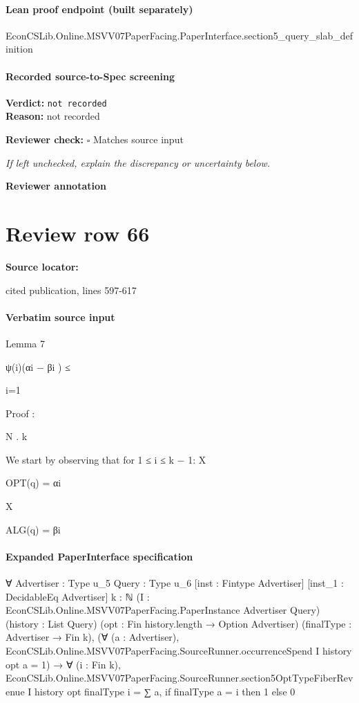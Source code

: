 \documentclass[10pt]{article}
\newcommand{\reviewerbox}{%
  \par\noindent\fbox{\parbox{0.96\linewidth}{\rule{0pt}{0.38in}}}\par
}
\newcommand{\reviewmatch}[1]{%
  \par\noindent\textbf{Reviewer check:} $\square$\; #1\par
  \noindent\emph{If left unchecked, explain the discrepancy or uncertainty below.}\par
}
\begin{document}
\paragraph{Lean proof endpoint (built separately)}\begin{ReviewVerbatim}
EconCSLib.Online.MSVV07PaperFacing.PaperInterface.section5_query_slab_definition
\end{ReviewVerbatim}

\paragraph{Recorded source-to-Spec screening}
\textbf{Verdict:} \texttt{not recorded}
\\
\textbf{Reason:} not recorded
\reviewmatch{Matches source input}
\noindent\textbf{Reviewer annotation}\par
\reviewerbox
\clearpage
\hypertarget{source-claim-ef85e288c3a31c13}{}
\section*{Review row 66}
\textbf{Source locator:} {\footnotesize\raggedright cited publication, lines 597-\allowbreak{}617\par}
\paragraph{Verbatim source input}
\begin{ReviewVerbatim}
Lemma 7

ψ(i)(αi − βi ) ≤

i=1

Proof :

N
.
k

We start by observing that for 1 ≤ i ≤ k − 1:
X

OPT(q) = αi

X

ALG(q) = βi
\end{ReviewVerbatim}


\paragraph{Expanded PaperInterface specification}
\begin{ReviewVerbatim}
∀ {Advertiser : Type u_5} {Query : Type u_6} [inst : Fintype Advertiser] [inst_1 : DecidableEq Advertiser] {k : ℕ}
  (I : EconCSLib.Online.MSVV07PaperFacing.PaperInstance Advertiser Query) (history : List Query)
  (opt : Fin history.length → Option Advertiser) (finalType : Advertiser → Fin k),
  (∀ (a : Advertiser), EconCSLib.Online.MSVV07PaperFacing.SourceRunner.occurrenceSpend I history opt a = 1) →
    ∀ (i : Fin k),
      EconCSLib.Online.MSVV07PaperFacing.SourceRunner.section5OptTypeFiberRevenue I history opt finalType i =
        ∑ a, if finalType a = i then 1 else 0
\end{ReviewVerbatim}
\end{document}
